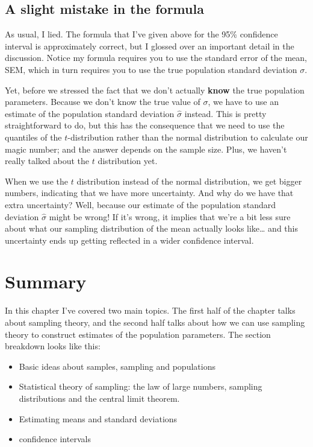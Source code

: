 \documentclass[
  letterpaper,
  DIV=11,
  numbers=noendperiod]{scrreprt}
\begin{document}
\subsection{A slight mistake in the
formula}\label{a-slight-mistake-in-the-formula}

As usual, I lied. The formula that I've given above for the 95\%
confidence interval is approximately correct, but I glossed over an
important detail in the discussion. Notice my formula requires you to
use the standard error of the mean, SEM, which in turn requires you to
use the true population standard deviation \(\sigma\).

Yet, before we stressed the fact that we don't actually \textbf{know}
the true population parameters. Because we don't know the true value of
\(\sigma\), we have to use an estimate of the population standard
deviation \(\hat{\sigma}\) instead. This is pretty straightforward to
do, but this has the consequence that we need to use the quantiles of
the \(t\)-distribution rather than the normal distribution to calculate
our magic number; and the answer depends on the sample size. Plus, we
haven't really talked about the \(t\) distribution yet.

When we use the \(t\) distribution instead of the normal distribution,
we get bigger numbers, indicating that we have more uncertainty. And why
do we have that extra uncertainty? Well, because our estimate of the
population standard deviation \(\hat\sigma\) might be wrong! If it's
wrong, it implies that we're a bit less sure about what our sampling
distribution of the mean actually looks like\ldots{} and this
uncertainty ends up getting reflected in a wider confidence interval.

\section{Summary}\label{summary-2}

In this chapter I've covered two main topics. The first half of the
chapter talks about sampling theory, and the second half talks about how
we can use sampling theory to construct estimates of the population
parameters. The section breakdown looks like this:

\begin{itemize}
\item
  Basic ideas about samples, sampling and populations
\item
  Statistical theory of sampling: the law of large numbers, sampling
  distributions and the central limit theorem.
\item
  Estimating means and standard deviations
\item
  confidence intervals
\end{itemize}
\end{document}
